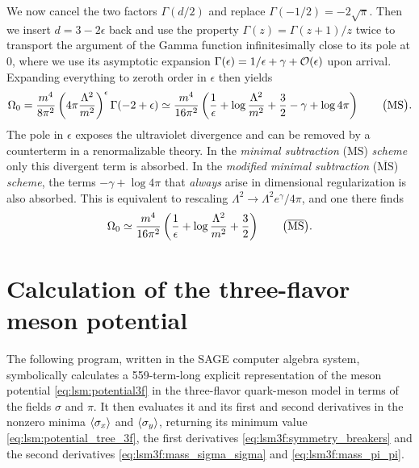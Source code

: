 We now cancel the two factors $\Gamma(d/2)$ and replace $\Gamma(-1/2) = -2\sqrt{\pi}$.
Then we insert $d = 3 - 2 \epsilon$ back and use the property $\Gamma(z) = \Gamma(z+1) / z$ twice to transport the argument of the Gamma function infinitesimally close to its pole at $0$,
where we use its asymptotic expansion $\Gamma(\epsilon) = 1/\epsilon + \gamma + \mathcal{O}(\epsilon)$ upon arrival.
Expanding everything to zeroth order in $\epsilon$ then yields
\begin{equation}
	\Omega_0 =       \frac{m^4}{8 \pi^2} \left( 4 \pi \frac{\Lambda^2}{m^2} \right)^\epsilon \Gamma(-2 + \epsilon)
	         \simeq \frac{m^4}{16 \pi^2} \left( \frac{1}{\epsilon} + \log \frac{\Lambda^2}{m^2} + \frac32 - \gamma + \log 4 \pi \right)
	         \qquad \big( \text{MS} \big).
\label{eq:diracsea:pole_expansion}
\end{equation}
The pole in $\epsilon$ exposes the ultraviolet divergence and can be removed by a counterterm in a renormalizable theory.
In the \emph{minimal subtraction} ($\text{MS}$) \emph{scheme} only this divergent term is absorbed.
In the \emph{modified minimal subtraction} ($\overline{\text{MS}}$) \emph{scheme},
the terms $-\gamma + \log 4 \pi$ that \emph{always} arise in dimensional regularization is also absorbed.
This is equivalent to rescaling $\Lambda^2 \rightarrow \Lambda^2 e^\gamma / 4 \pi$,
and one there finds
\begin{equation}
	\Omega_0 \simeq \frac{m^4}{16 \pi^2} \left( \frac{1}{\epsilon} + \log \frac{\Lambda^2}{m^2} + \frac32 \right)
	\qquad \big( \overline{\text{MS}} \big) .
\label{eq:diracsea:pole_expansion_modified}
\end{equation}

\chapter{Calculation of the three-flavor meson potential}
\label{chap:lsm3fpotential}

The following program, written in the SAGE computer algebra system,
symbolically calculates a 559-term-long explicit representation of the meson potential \eqref{eq:lsm:potential3f} in the three-flavor quark-meson model in terms of the fields $\sigma$ and $\pi$.
It then evaluates it and its first and second derivatives in the nonzero minima $\langle \sigma_x \rangle$ and $\langle \sigma_y \rangle$,
returning its minimum value \eqref{eq:lsm:potential_tree_3f}, the first derivatives \eqref{eq:lsm3f:symmetry_breakers} and the second derivatives \eqref{eq:lsm3f:mass_sigma_sigma} and \eqref{eq:lsm3f:mass_pi_pi}.

